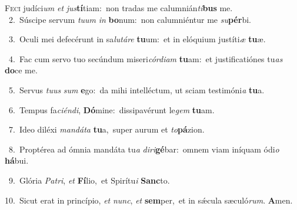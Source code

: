 \lettrine{\initial\textcolor{\initialcolor}{F}}{eci} judíci\textit{um} \textit{et} \textit{jus}\-\textbf{tí}tiam:~\star non tradas me calumnián\-\textit{ti}\-\textbf{bus} me.\\
{\numbfont\textcolor{\numbcolor}{~2.}}~Súscipe servum \textit{tu}\-\textit{um} \textit{in} \textbf{bo}\-num:~\star non calumniéntur me \textit{su}\-\textbf{pér}bi.\par
{\numbfont\textcolor{\numbcolor}{~3.}}~Oculi mei defecérunt in sa\-\textit{lu}\-\textit{tá}\textit{re} \textbf{tu}\-um:~\star et in elóquium justíti\textit{æ} \textbf{tu}\-æ.\par
{\numbfont\textcolor{\numbcolor}{~4.}}~Fac cum servo tuo secúndum miseri\-\textit{cór}\-\textit{di}\textit{am} \textbf{tu}\-am:~\star et justificatiónes tu\textit{as} \textbf{do}\-ce me.\par
{\numbfont\textcolor{\numbcolor}{~5.}}~Servus \textit{tu}\-\textit{us} \textit{sum} \textbf{e}\-go:~\star da mihi intelléctum, ut sciam testimóni\textit{a} \textbf{tu}\-a.\par
{\numbfont\textcolor{\numbcolor}{~6.}}~Tempus fa\-\textit{ci}\-\textit{én}\textit{di}, \textbf{Dó}\-mine:~\star dissipavérunt le\textit{gem} \textbf{tu}\-am.\par
{\numbfont\textcolor{\numbcolor}{~7.}}~Ideo diléxi \textit{man}\-\textit{dá}\textit{ta} \textbf{tu}\-a,~\star super aurum et \textit{to}\-\textbf{pá}zion.\par
{\numbfont\textcolor{\numbcolor}{~8.}}~Proptérea ad ómnia mandáta tu\textit{a} \textit{di}\-\textit{ri}\textbf{gé}bar:~\star omnem viam iníquam ódi\textit{o} \textbf{há}\-bui.\par
{\numbfont\textcolor{\numbcolor}{~9.}}~Glória \textit{Pa}\-\textit{tri}, \textit{et} \textbf{Fí}\-lio,~\star et Spirítu\textit{i} \textbf{Sanc}\-to.\par
{\numbfont\textcolor{\numbcolor}{10.}}~Sicut erat in princípio, \textit{et} \textit{nunc}\-, \textit{et} \textbf{sem}\-per,~\star et in sǽcula sæculó\-\textit{rum}\-. \textbf{A}\-men.\par
